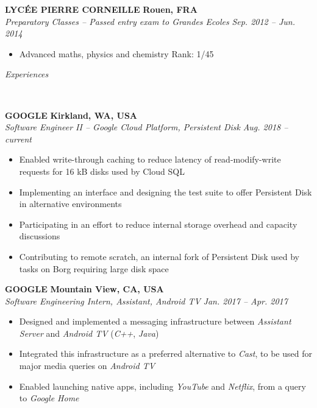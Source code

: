 \documentclass[a4paper, 12pt]{article}
\newcommand{\marginline}{-0.3cm}
\newcommand{\margincontent}{-0.6cm}
\newcommand{\marginbeforesection}{0.35cm}
\newcommand{\linewidthperso}{0.02cm}
\newcommand{\styletitle}[1]{\textbf{#1}}
\newcommand{\styledesc}[1]{\textit{#1}}
\newcommand{\styleloc}[1]{\textbf{#1}}
\newcommand{\styledates}[1]{\textit{#1}}
\newcommand{\stylesection}[1]{
  \vspace{\marginbeforesection}
  \begin{normalsize}\textit{#1}\end{normalsize}
  \vspace{\marginline}\\
  \noindent\makebox[\linewidth]{\rule{\textwidth}{\linewidthperso}}

}
\begin{document}
\begin{footnotesize}
\styletitle{LYC\'EE PIERRE CORNEILLE} \hfill \styleloc{Rouen, FRA}\\
\styledesc{Preparatory Classes -- Passed entry exam to Grandes Ecoles} \hfill \styledates{Sep. 2012 -- Jun. 2014}\\
\vspace{\margincontent}
\begin{itemize}
  \item Advanced maths, physics and chemistry \hfill Rank: 1/45
\end{itemize}

\stylesection{Experiences}

\styletitle{GOOGLE} \hfill \styleloc{Kirkland, WA, USA}\\
\styledesc{Software Engineer II -- Google Cloud Platform, Persistent Disk} \hfill \styledates{Aug. 2018 -- current}\\
\vspace{\margincontent}
\begin{itemize}
  \item Enabled write-through caching to reduce latency of read-modify-write requests for 16 kB disks used by Cloud SQL
  \item Implementing an interface and designing the test suite to offer Persistent Disk in alternative environments
  \item Participating in an effort to reduce internal storage overhead and capacity discussions
  \item Contributing to remote scratch, an internal fork of Persistent Disk used by tasks on Borg requiring large disk space
\end{itemize}

\styletitle{GOOGLE} \hfill \styleloc{Mountain View, CA, USA}\\
\styledesc{Software Engineering Intern, Assistant, Android TV} \hfill \styledates{Jan. 2017 -- Apr. 2017}\\
\vspace{\margincontent}
\begin{itemize}
  \item Designed and implemented a messaging infrastructure between \textit{Assistant Server} and \textit{Android TV} (\textit{C++}, \textit{Java})
  \item Integrated this infrastructure as a preferred alternative to \textit{Cast}, to be used for major media queries on \textit{Android TV}
  \item Enabled launching native apps, including \textit{YouTube} and \textit{Netflix}, from a query to \textit{Google Home}
\end{itemize}


\end{footnotesize}
\end{document}
